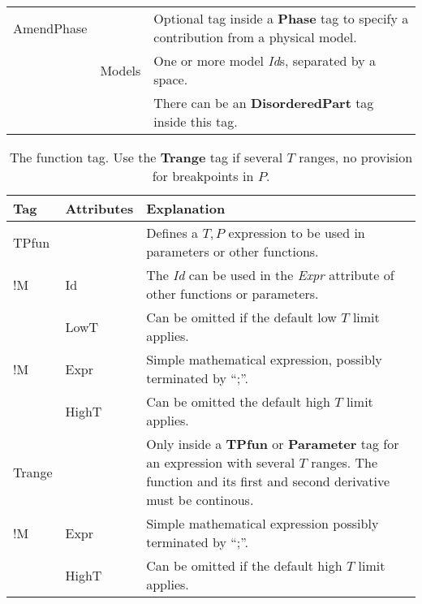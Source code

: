 \documentclass[10pt]{article}
\begin{document}
\begin{table}[!h]
\begin{tabular}{|p{} p{} p{}|}
  AmendPhase & & Optional tag inside a {\bf Phase} tag to specify a contribution
               from a physical model.\\
     & Models & One or more model {\em Id}s, separated by a space. \\

           & & There can be an {\bf DisorderedPart} tag inside this tag.\\\hline

\end{tabular}
\end{table}


\begin{table}[!h]
  \caption{The function tag.  Use the {\bf Trange} tag if several $T$ ranges, no provision for breakpoints in $P$.}

\begin{tabular}{|p{} p{} p{}|}\hline
  Tag & Attributes & Explanation\\\hline

  TPfun & & Defines a $T, P$ expression to be used in parameters or other functions.\\
  
!M        & Id & The {\em Id} can be used in the
                 {\em Expr} attribute of other functions or parameters. \\

        & LowT & Can be omitted if the default low $T$ limit applies.\\
                 !M       & Expr &  Simple mathematical expression, possibly terminated by ``;''.\\
           
        & HighT & Can be omitted the default high $T$ limit applies.\\\hline

  Trange & & Only inside a {\bf TPfun} or {\bf Parameter} tag for an
             expression with several $T$ ranges.  The function and
             its first and second derivative must be continous.\\

!M & Expr & Simple mathematical expression possibly terminated by ``;''.\\

   & HighT & Can be omitted if the default high $T$ limit applies.\\\hline
\end{tabular}

\end{table}
\end{document}
